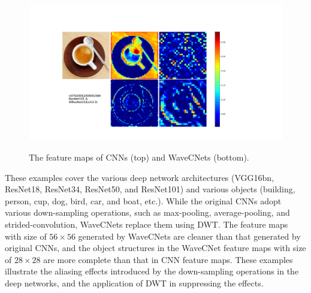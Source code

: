 \begin{figure}[!bpt]
	{\includegraphics*[scale=0.25, viewport=175 65 1025 575]{figures/feature_map_clean/00041584_WResNet101.pdf}}\hspace{30pt}
	\caption{The feature maps of CNNs (top) and WaveCNets (bottom).}
	\label{fig_feature_maps_more_1}
\end{figure}

These examples cover the various deep network architectures (VGG16bn, ResNet18, ResNet34, ResNet50, and ResNet101)
and various objects (building, person, cup, dog, bird, car, and boat, etc.).
While the original CNNs adopt various down-sampling operations, such as max-pooling, average-pooling, and strided-convolution,
WaveCNets replace them using DWT.
The feature maps with size of $56\times56$ generated by WaveCNets are cleaner than that generated by original CNNs,
and the object structures in the WaveCNet feature maps with size of $28 \times 28$ are more complete than that in CNN feature maps.
These examples illustrate the aliasing effects introduced by the down-sampling operations in the deep networks,
and the application of DWT in suppressing the effects.

